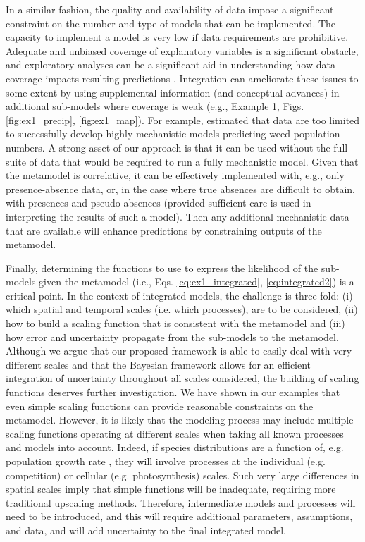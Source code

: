 \documentclass[11pt]{article}
\begin{document}
In a similar fashion, the quality and availability of data impose a significant constraint on the number and type of models that can be implemented.
The capacity to implement a model is very low if data requirements are prohibitive. 
Adequate and unbiased coverage of explanatory variables is a significant obstacle, and exploratory analyses can be a significant aid in understanding how data coverage impacts resulting predictions \citep{Mckenney2002}.
Integration can ameliorate these issues to some extent by using supplemental information (and conceptual advances) in additional sub-models where coverage is weak (e.g., Example 1, Figs. \ref{fig:ex1_precip}, \ref{fig:ex1_map}).
For example, \citet{Freckleton2009} estimated that data are too limited to successfully develop highly mechanistic models predicting weed population numbers. 
A strong asset of our approach is that it can be used without the full suite of data that would be required to run a fully mechanistic model. 
Given that the metamodel is correlative, it can be effectively implemented with, e.g., only presence-absence data, or, in the case where true absences are difficult to obtain, with presences and pseudo absences (provided sufficient care is used in interpreting the results of such a model).
Then any additional mechanistic data that are available will enhance predictions by constraining outputs of the metamodel. 

Finally, determining the functions to use to express the likelihood of the sub-models given the metamodel (i.e., Eqs. \ref{eq:ex1_integrated}, \ref{eq:integrated2}) is a critical point.
In the context of integrated models, the challenge is three fold: (i) which spatial and temporal scales (i.e. which processes), are to be considered, (ii) how to build a scaling function that is consistent with the metamodel and (iii) how error and uncertainty propagate from the sub-models to the metamodel. 
Although we argue that our proposed framework is able to easily deal with very different scales and that the Bayesian framework allows for an efficient integration of uncertainty throughout all scales considered, the building of scaling functions deserves further investigation. 
We have shown in our examples that even simple scaling functions can provide reasonable constraints on the metamodel. 
However, it is likely that the modeling process may include multiple scaling functions operating at different scales when taking all known processes and models into account. 
Indeed, if species distributions are a function of, e.g. population growth rate \citep{Sykes1996, Guisan2000}, they will involve processes at the individual (e.g. competition) or cellular (e.g. photosynthesis) scales. 
Such very large differences in spatial scales imply that simple functions will be inadequate, requiring more traditional upscaling methods. 
Therefore, intermediate models and processes will need to be introduced, and this will require additional parameters, assumptions, and data, and will add uncertainty to the final integrated model.
\end{document}
